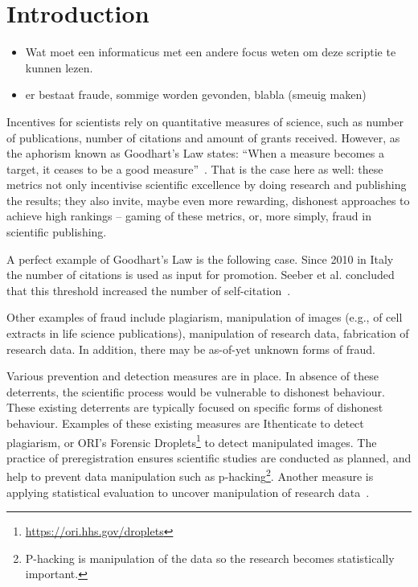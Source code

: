 \documentclass{ou-report}
\newcommand{\outline}[1]{{\color{blue} #1}}
\begin{document}
\chapter{Introduction}
\outline{
\begin{itemize}
    \item Wat moet een informaticus met een andere focus weten om deze scriptie 
        te kunnen lezen.
    \item er bestaat fraude, sommige worden gevonden, blabla (smeuig maken)
\end{itemize}
}
Incentives for scientists rely on quantitative measures of science, such as 
number of publications, number of citations and amount of grants received. 
However, as the aphorism known as Goodhart's Law states: ``When a measure 
becomes a target, it ceases to be a good measure''~\cite{strathern_1997}. That 
is the case here as well: these metrics not only incentivise scientific 
excellence by doing research and publishing the results; they also invite, 
maybe even more rewarding, dishonest approaches to achieve high rankings 
-- gaming of these metrics, or, more simply, fraud in scientific publishing. 

A perfect example of Goodhart's Law is the following case. Since 2010 in 
Italy the number of citations is used as input for promotion. Seeber et al.
concluded that this threshold increased the number of 
self-citation~\cite{SEEBER2019478}.

Other examples of fraud include plagiarism, manipulation of images (e.g., of cell 
extracts in life science publications), manipulation of research data, 
fabrication of research data. In addition, there may be as-of-yet unknown forms 
of fraud.

Various prevention and detection measures are in place. In absence of these 
deterrents, the scientific process would be vulnerable to dishonest behaviour. 
These existing deterrents are typically focused on specific forms of dishonest 
behaviour. Examples of these existing measures are Ithenticate to detect 
plagiarism, or ORI's Forensic Droplets\footnote{\url{https://ori.hhs.gov/droplets}} 
to detect manipulated images. The practice of preregistration ensures scientific 
studies are conducted as planned, and help to prevent data manipulation such as 
p-hacking\footnote{P-hacking is manipulation of the data so the research becomes 
statistically important.}. Another measure is applying statistical evaluation to 
uncover manipulation of research data~\cite{HGWA2019}. 
\end{document}
